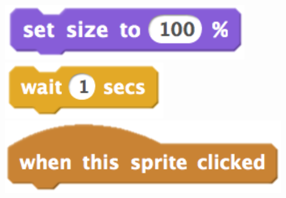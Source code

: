 \documentclass[a4paper,12pt]{article}
\begin{document}
    \includegraphics[height=0.04\paperheight]{setSize.png}
    \includegraphics[height=0.04\paperheight]{wait.png}
    \includegraphics[height=0.055\paperheight]{when.png}
\end{document}

